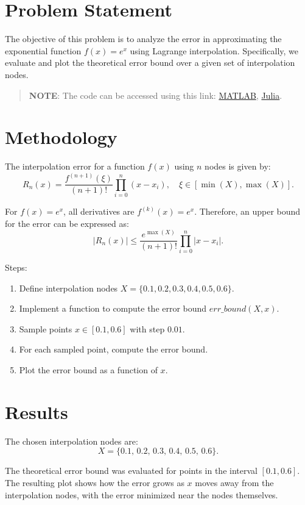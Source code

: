 \section*{Problem Statement}
The objective of this problem is to analyze the error in approximating the exponential function $f(x) = e^x$ using Lagrange interpolation. Specifically, we evaluate and plot the theoretical error bound over a given set of interpolation nodes.

\begin{quote}
  \textbf{NOTE}: The code can be accessed using this link: \href{https://raw.githubusercontent.com/HavokSahil/computational-techniques-assignments/refs/heads/main/assignment3/a3.m}{MATLAB}, \href{https://raw.githubusercontent.com/HavokSahil/computational-techniques-assignments/refs/heads/main/assignment3/a3.jl}{Julia}.
\end{quote}

\section*{Methodology}
The interpolation error for a function $f(x)$ using $n$ nodes is given by:
\[
  R_n(x) = \frac{f^{(n+1)}(\xi)}{(n+1)!} \prod_{i=0}^{n} (x - x_i), \quad \xi \in [\min(X), \max(X)].
\]

For $f(x) = e^x$, all derivatives are $f^{(k)}(x) = e^x$. Therefore, an upper bound for the error can be expressed as:
\[
  |R_n(x)| \leq \frac{e^{\max(X)}}{(n+1)!} \prod_{i=0}^{n} |x - x_i|.
\]

Steps:
\begin{enumerate}
  \item Define interpolation nodes $X = \{0.1, 0.2, 0.3, 0.4, 0.5, 0.6\}$.
  \item Implement a function to compute the error bound $err\_bound(X, x)$.
  \item Sample points $x \in [0.1, 0.6]$ with step $0.01$.
  \item For each sampled point, compute the error bound.
  \item Plot the error bound as a function of $x$.
\end{enumerate}

\section*{Results}
The chosen interpolation nodes are:
\[
X = \{0.1,\,0.2,\,0.3,\,0.4,\,0.5,\,0.6\}.
\]

The theoretical error bound was evaluated for points in the interval $[0.1, 0.6]$. The resulting plot shows how the error grows as $x$ moves away from the interpolation nodes, with the error minimized near the nodes themselves.

